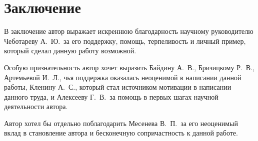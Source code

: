 \chapter*{Заключение}                       %





В заключение автор выражает искреннюю благодарность научному руководителю
Чеботареву А.\ Ю.\ за его поддержку,
помощь, терпеливость и личный пример,
который сделал данную работу возможной.

Особую признательность автор хочет выразить Байдину А.\ В.,
Бризицкому Р.\ В., Артемьевой И.\ Л., чья поддержка оказалась
неоценимой в написании данной работы,
Кленину А.\ С., который стал источником мотивации в написании данного труда,
и Алексееву Г.\ В.\ за помощь в первых шагах научной деятельности автора.

Автор хотел бы отдельно поблагодарить Месенева В.\ П.\
за его неоценимый вклад в становление автора и бесконечную сопричастность к данной работе.
